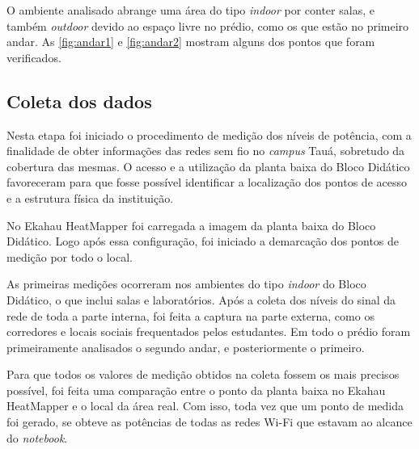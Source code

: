 O ambiente analisado abrange uma área do tipo \textit{indoor} por conter salas, e também \textit{outdoor} devido ao espaço livre no prédio, como os que estão no primeiro andar. As \autoref{fig:andar1} e \ref{fig:andar2} mostram alguns dos pontos que foram verificados.

\begin{figure}[H]
	\centering
\end{figure}

\begin{figure}[H]
	\centering
\end{figure}

\subsection{Coleta dos dados}
\label{subsec:coleta-de-dados}

Nesta etapa foi iniciado o procedimento de medição dos níveis de potência, com a finalidade de obter informações das redes sem fio no \textit{campus} Tauá, sobretudo da cobertura das mesmas. O acesso e a utilização da planta baixa do Bloco Didático favoreceram para que fosse possível identificar a localização dos pontos de acesso e a estrutura física da instituição.

No Ekahau HeatMapper foi carregada a imagem da planta baixa do Bloco Didático. Logo após essa configuração, foi iniciado a demarcação dos pontos de medição por todo o local.

As primeiras medições ocorreram nos ambientes do tipo \textit{indoor} do Bloco Didático, o que inclui salas e laboratórios. Após a coleta dos níveis do sinal da rede de toda a parte interna, foi feita a captura na parte externa, como os corredores e locais sociais frequentados pelos estudantes. Em todo o prédio foram primeiramente analisados o segundo andar, e posteriormente o primeiro.

Para que todos os valores de medição obtidos na coleta fossem os mais precisos possível, foi feita uma comparação entre o ponto da planta baixa no Ekahau HeatMapper e o local da área real. Com isso, toda vez que um ponto de medida foi gerado, se obteve as potências de todas as redes Wi-Fi que estavam ao alcance do \textit{notebook}.

